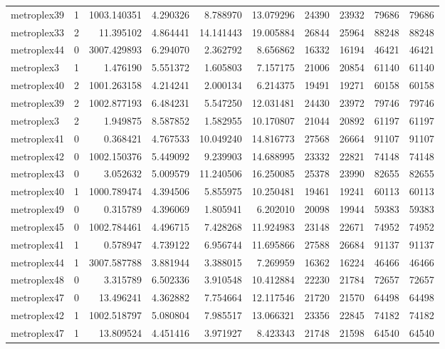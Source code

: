 \begin{longtable}{|l|r|r|r|r|r|r|r|r|r|}
metroplex39 & 1 & 1003.140351 & 4.290326 & 8.788970 & 13.079296 & 24390 & 23932 & 79686 & 79686 \\
metroplex33 & 2 & 11.395102 & 4.864441 & 14.141443 & 19.005884 & 26844 & 25964 & 88248 & 88248 \\
metroplex44 & 0 & 3007.429893 & 6.294070 & 2.362792 & 8.656862 & 16332 & 16194 & 46421 & 46421 \\
metroplex3 & 1 & 1.476190 & 5.551372 & 1.605803 & 7.157175 & 21006 & 20854 & 61140 & 61140 \\
metroplex40 & 2 & 1001.263158 & 4.214241 & 2.000134 & 6.214375 & 19491 & 19271 & 60158 & 60158 \\
metroplex39 & 2 & 1002.877193 & 6.484231 & 5.547250 & 12.031481 & 24430 & 23972 & 79746 & 79746 \\
metroplex3 & 2 & 1.949875 & 8.587852 & 1.582955 & 10.170807 & 21044 & 20892 & 61197 & 61197 \\
metroplex41 & 0 & 0.368421 & 4.767533 & 10.049240 & 14.816773 & 27568 & 26664 & 91107 & 91107 \\
metroplex42 & 0 & 1002.150376 & 5.449092 & 9.239903 & 14.688995 & 23332 & 22821 & 74148 & 74148 \\
metroplex43 & 0 & 3.052632 & 5.009579 & 11.240506 & 16.250085 & 25378 & 23990 & 82655 & 82655 \\
metroplex40 & 1 & 1000.789474 & 4.394506 & 5.855975 & 10.250481 & 19461 & 19241 & 60113 & 60113 \\
metroplex49 & 0 & 0.315789 & 4.396069 & 1.805941 & 6.202010 & 20098 & 19944 & 59383 & 59383 \\
metroplex45 & 0 & 1002.784461 & 4.496715 & 7.428268 & 11.924983 & 23148 & 22671 & 74952 & 74952 \\
metroplex41 & 1 & 0.578947 & 4.739122 & 6.956744 & 11.695866 & 27588 & 26684 & 91137 & 91137 \\
metroplex44 & 1 & 3007.587788 & 3.881944 & 3.388015 & 7.269959 & 16362 & 16224 & 46466 & 46466 \\
metroplex48 & 0 & 3.315789 & 6.502336 & 3.910548 & 10.412884 & 22230 & 21784 & 72657 & 72657 \\
metroplex47 & 0 & 13.496241 & 4.362882 & 7.754664 & 12.117546 & 21720 & 21570 & 64498 & 64498 \\
metroplex42 & 1 & 1002.518797 & 5.080804 & 7.985517 & 13.066321 & 23356 & 22845 & 74182 & 74182 \\
metroplex47 & 1 & 13.809524 & 4.451416 & 3.971927 & 8.423343 & 21748 & 21598 & 64540 & 64540 \\

\end{longtable}
